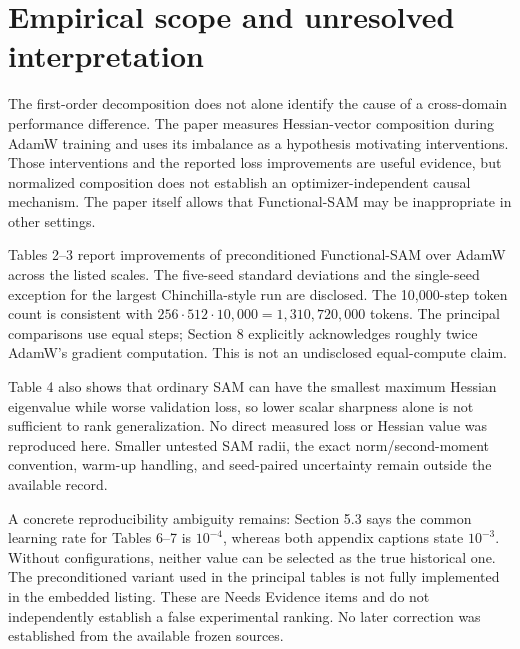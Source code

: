 \documentclass[10pt]{article}
\begin{document}
\section*{Empirical scope and unresolved interpretation}
The first-order decomposition does not alone identify the cause of a cross-domain performance difference. The paper measures Hessian-vector composition during AdamW training and uses its imbalance as a hypothesis motivating interventions. Those interventions and the reported loss improvements are useful evidence, but normalized composition does not establish an optimizer-independent causal mechanism. The paper itself allows that Functional-SAM may be inappropriate in other settings.\par
Tables 2–3 report improvements of preconditioned Functional-SAM over AdamW across the listed scales. The five-seed standard deviations and the single-seed exception for the largest Chinchilla-style run are disclosed. The 10,000-step token count is consistent with \(256\cdot512\cdot10{,}000=1{,}310{,}720{,}000\) tokens. The principal comparisons use equal steps; Section 8 explicitly acknowledges roughly twice AdamW’s gradient computation. This is not an undisclosed equal-compute claim.\par
Table 4 also shows that ordinary SAM can have the smallest maximum Hessian eigenvalue while worse validation loss, so lower scalar sharpness alone is not sufficient to rank generalization. No direct measured loss or Hessian value was reproduced here. Smaller untested SAM radii, the exact norm/second-moment convention, warm-up handling, and seed-paired uncertainty remain outside the available record.\par
A concrete reproducibility ambiguity remains: Section 5.3 says the common learning rate for Tables 6–7 is \(10^{-4}\), whereas both appendix captions state \(10^{-3}\). Without configurations, neither value can be selected as the true historical one. The preconditioned variant used in the principal tables is not fully implemented in the embedded listing. These are Needs Evidence items and do not independently establish a false experimental ranking. No later correction was established from the available frozen sources.\par
\end{document}
